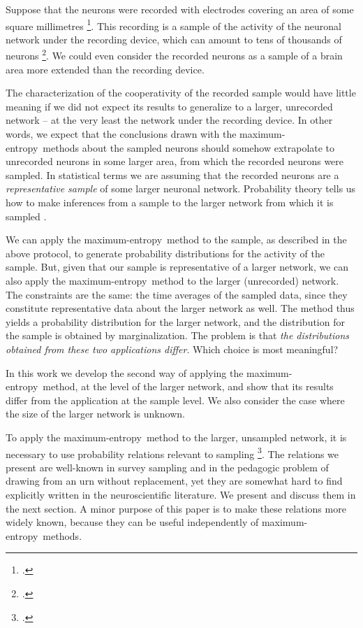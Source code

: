 \documentclass[\ifafour a4paper,12pt,\else a5paper,10pt,\fi%
onecolumn,oneside,article,%
british%
]{memoir}
\theoremstyle{remark}
\theoremstyle{innote}
\let\parentext=\parentexttrack%
\newcommand*{\citep}{\footcites}
\renewcommand*{\|}[1][]{\nonscript\,#1\vert\nonscript\;\mathopen{}}
\newcommand*{\chap}{ch.}%
\newcommand*{\cf}{{cf.}}
\newcommand*{\me}{maximum-entropy}
\begin{document}
Suppose that the neurons were recorded with electrodes covering an area of
some square millimetres \citep[\cf][]{berenyietal2014}. This recording is a
sample of the activity of the neuronal network under the recording
device, which can amount to tens of thousands of neurons
\citep{abeles1991}. We could even consider the recorded neurons as a sample
of a brain area more extended than the recording device.

The characterization of the cooperativity of the recorded sample would have
little meaning if we did not expect its results to generalize to a larger,
unrecorded network -- at the very least the network under the
recording device. In other words, we expect that the conclusions drawn with
the \me\ methods about the sampled neurons should somehow extrapolate to
unrecorded neurons in some larger area, from which the recorded neurons
were sampled. In statistical terms we are assuming that the recorded
neurons are a \emph{representative sample} of some larger neuronal
network. Probability theory tells us how to make inferences from a
sample to the larger network from which it is sampled \parentext{see
  references below}.

We can apply the \me\ method to the sample, as described in the above
protocol, to generate probability distributions for the activity of the
sample. But, given that our sample is representative of a larger
network, we can also apply the \me\ method to the larger (unrecorded)
network. The constraints are the same: the time averages of the sampled
data, since they constitute representative data about the larger network
as well. The method thus yields a probability distribution for the larger
network, and the distribution for the sample is obtained by
marginalization. The problem is that \emph{the distributions obtained from
  these two applications differ}. Which choice is most meaningful?

In this work we develop the second way of applying the \me\ method, at the
level of the larger network, and show that its results differ from the
application at the sample level. We also consider the case where the size
of the larger network is unknown.

To apply the \me\ method to the larger, unsampled network, it is
necessary to use probability relations relevant to sampling
\citep{ghoshetal1997}[parts~I,
VI]{freedmanetal1978_r2007}[\chap~8]{gelmanetal1995_r2014}[\chap~3]{jaynes1994_r2003}.
The relations we present are well-known in survey sampling and in the
pedagogic problem of drawing from an urn without replacement, yet they are
somewhat hard to find explicitly written in the neuroscientific literature.
We present and discuss them in the next section. A minor purpose of this
paper is to make these relations more widely known, because they can be
useful independently of \me\ methods.
\end{document}
